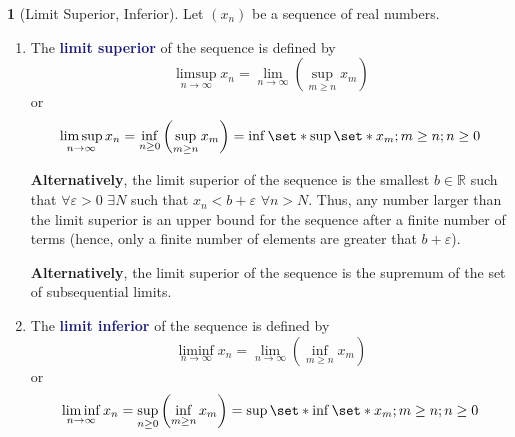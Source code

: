 \documentclass[12pt]{article}
\numberwithin{equation}{section}
\newcommand{\navy}[1]{\textcolor{MidnightBlue}{\bf #1}}
\theoremstyle{plain}
\theoremstyle{definition}
\newtheorem{definition}{\color{MidnightBlue}{\textbf{Definition}}}[section]
\newcommand\parens[1]{\left( #1 \right)}
\def\Set{\set*}%
\newcommand{\1}{\mathbbm 1}
\newcommand{\e}{\varepsilon}
\newcommand{\RR}{\mathbb R}
\begin{document}
\begin{definition}[Limit Superior, Inferior]
	Let $\parens{x_n}$ be a sequence of real numbers.

	\begin{enumerate}
		\item The \navy{limit superior} of the sequence is defined by
			\begin{equation}
				\limsup\limits_{n \to \infty} x_n = \lim_{n \to \infty}\parens{\sup_{m \geq n} x_m}
			\end{equation}
			or
			\begin{equation}
				\limsup\limits_{n \to \infty} x_n = \inf_{n \geq 0} \parens{\sup_{m \geq n} x_m} = \inf\Set{\sup \Set{x_m; m \geq n}; n \geq 0}
			\end{equation}

			\textbf{Alternatively}, the limit superior of the sequence is the smallest $b \in \RR$ such that $\forall \e > 0$ $\exists N$ such that $x_n < b + \e$ $\forall n > N$. Thus, any number larger than the limit superior is an upper bound for the sequence after a finite number of terms (hence, only a finite number of elements are greater that $b + \e$).

			\textbf{Alternatively}, the limit superior of the sequence is the supremum of the set of subsequential limits. 

		\item The \navy{limit inferior} of the sequence is defined by
			\begin{equation}
				\liminf\limits_{n \to \infty} x_n = \lim_{n \to \infty}\parens{\inf_{m \geq n} x_m}
			\end{equation}
			or
			\begin{equation}
				\liminf\limits_{n \to \infty} x_n = \sup_{n \geq 0} \parens{\inf_{m \geq n} x_m} = \sup\Set{\inf \Set{x_m; m \geq n}; n \geq 0}
			\end{equation}	
	\end{enumerate}

\end{definition}
\end{document}
